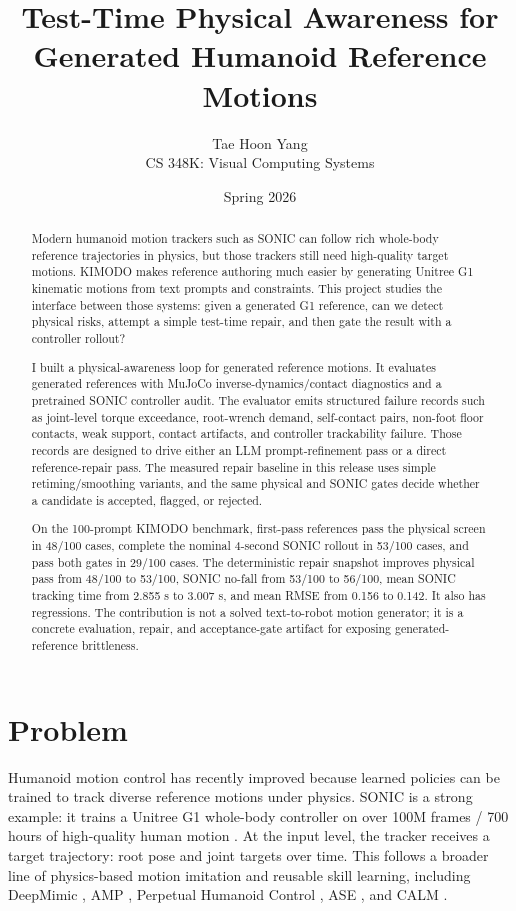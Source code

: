 \documentclass[10pt]{article}
\title{Test-Time Physical Awareness for Generated Humanoid Reference Motions}
\author{Tae Hoon Yang\\CS 348K: Visual Computing Systems}
\date{Spring 2026}
\begin{document}
\maketitle

\begin{abstract}
Modern humanoid motion trackers such as SONIC can follow rich whole-body
reference trajectories in physics, but those trackers still need high-quality
target motions. KIMODO makes reference authoring much easier by generating
Unitree G1 kinematic motions from text prompts and constraints. This project
studies the interface between those systems: given a generated G1 reference,
can we detect physical risks, attempt a simple test-time repair, and then gate
the result with a controller rollout?

I built a physical-awareness loop for generated reference motions. It evaluates
generated references with MuJoCo inverse-dynamics/contact diagnostics
\cite{mujoco} and a pretrained SONIC controller audit. The evaluator emits
structured failure records such as joint-level torque exceedance, root-wrench
demand, self-contact pairs, non-foot floor contacts, weak support, contact
artifacts, and controller trackability failure. Those records are designed to
drive either an LLM prompt-refinement pass or a direct reference-repair pass.
The measured repair baseline in this release uses simple retiming/smoothing
variants, and the same physical and SONIC gates decide whether a candidate is
accepted, flagged, or rejected.

On the 100-prompt KIMODO benchmark, first-pass references pass the physical
screen in 48/100 cases, complete the nominal 4-second SONIC rollout in 53/100
cases, and pass both gates in 29/100 cases. The deterministic repair snapshot
improves physical pass from 48/100 to 53/100, SONIC no-fall from 53/100 to
56/100, mean SONIC tracking time from 2.855 s to 3.007 s, and mean RMSE from
0.156 to 0.142. It also has regressions. The contribution is not a solved
text-to-robot motion generator; it is a concrete evaluation, repair, and
acceptance-gate artifact for exposing generated-reference brittleness.
\end{abstract}

\section{Problem}

Humanoid motion control has recently improved because learned policies can be
trained to track diverse reference motions under physics. SONIC is a strong
example: it trains a Unitree G1 whole-body controller on over 100M frames / 700
hours of high-quality human motion \cite{sonic}. At the input level, the
tracker receives a target trajectory: root pose and joint targets over time.
This follows a broader line of physics-based motion imitation and reusable
skill learning, including DeepMimic \cite{deepmimic}, AMP \cite{amp},
Perpetual Humanoid Control \cite{phc}, ASE \cite{ase}, and CALM \cite{calm}.
\end{document}
